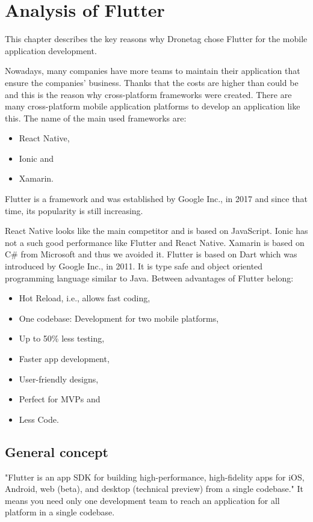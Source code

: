 \chapter{Analysis of Flutter}\label{ch:analysis-of-flutter}

This chapter describes the key reasons why Dronetag chose Flutter for the mobile application development.

Nowadays, many companies have more teams to maintain their application that ensure the companies' business.
Thanks that the costs are higher than could be and this is the reason why cross-platform frameworks were created.
There are many cross-platform mobile application platforms to develop an application like this.
The name of the main used frameworks are:
\begin{itemize}
    \item React Native,
    \item Ionic and
    \item Xamarin.
\end{itemize}

Flutter is a framework and was established by Google Inc., in 2017 and since that time, its popularity is still increasing.

React Native looks like the main competitor and is based on JavaScript.\cite{flutterVsReactNativeNevercodeIo}
Ionic has not a such good performance like Flutter and React Native.
Xamarin is based on C\# from Microsoft and thus we avoided it.
Flutter is based on Dart which was introduced by Google Inc., in 2011.
It is type safe and object oriented programming language similar to Java.\cite{dartTypeSystem}
Between advantages of Flutter belong:
\begin{itemize}
    \item Hot Reload, i.e., allows fast coding,
    \item One codebase: Development for two mobile platforms,
    \item Up to 50\% less testing,
    \item Faster app development,
    \item User-friendly designs,
    \item Perfect for MVPs and
    \item Less Code.\cite{flutterVsReactNativeHackrIo}
\end{itemize}

\section{General concept}\label{sec:general-concept}
"Flutter is an app SDK for building high-performance, high-fidelity apps for iOS, Android, web (beta), and desktop (technical preview) from a single codebase."\cite{flutterTechnicalOverview}
It means you need only one development team to reach an application for all platform in a single codebase.

